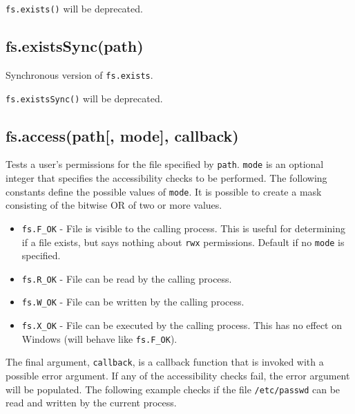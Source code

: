 \texttt{fs.exists()} will be deprecated.

\subsection{fs.existsSync(path)}\label{fs.existssyncpath}

Synchronous version of \texttt{fs.exists}.

\texttt{fs.existsSync()} will be deprecated.

\subsection{fs.access(path{[}, mode{]},
callback)}\label{fs.accesspath-mode-callback}

Tests a user's permissions for the file specified by \texttt{path}.
\texttt{mode} is an optional integer that specifies the accessibility
checks to be performed. The following constants define the possible
values of \texttt{mode}. It is possible to create a mask consisting of
the bitwise OR of two or more values.

\begin{itemize}
\itemsep1pt\parskip0pt
\item
  \texttt{fs.F\_OK} - File is visible to the calling process. This is
  useful for determining if a file exists, but says nothing about
  \texttt{rwx} permissions. Default if no \texttt{mode} is specified.
\item
  \texttt{fs.R\_OK} - File can be read by the calling process.
\item
  \texttt{fs.W\_OK} - File can be written by the calling process.
\item
  \texttt{fs.X\_OK} - File can be executed by the calling process. This
  has no effect on Windows (will behave like \texttt{fs.F\_OK}).
\end{itemize}

The final argument, \texttt{callback}, is a callback function that is
invoked with a possible error argument. If any of the accessibility
checks fail, the error argument will be populated. The following example
checks if the file \texttt{/etc/passwd} can be read and written by the
current process.

\begin{Shaded}
\begin{Highlighting}[]
\NormalTok{(}\NormalTok{, } \NormalTok{| }\NormalTok{, }
   \NormalTok{: }\NormalTok{);}
\NormalTok{\});}
\end{Highlighting}
\end{Shaded}

